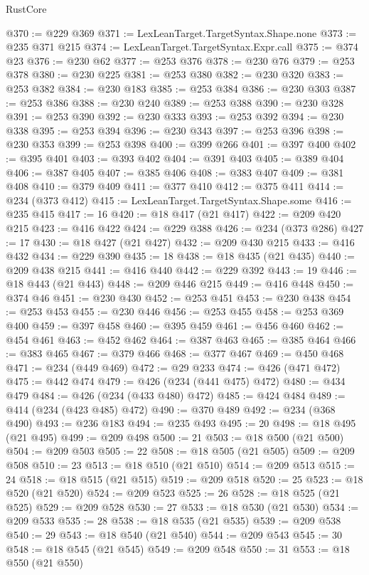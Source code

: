 \begin{lexlean}{RustCore}
\begin{coremodule}
@370 := @229 @369
@371 := LexLeanTarget.TargetSyntax.Shape.none
@373 := @235 @371 @215
@374 := LexLeanTarget.TargetSyntax.Expr.call
@375 := @374 @23
@376 := @230 @62
@377 := @253 @376
@378 := @230 @76
@379 := @253 @378
@380 := @230 @225
@381 := @253 @380
@382 := @230 @320
@383 := @253 @382
@384 := @230 @183
@385 := @253 @384
@386 := @230 @303
@387 := @253 @386
@388 := @230 @240
@389 := @253 @388
@390 := @230 @328
@391 := @253 @390
@392 := @230 @333
@393 := @253 @392
@394 := @230 @338
@395 := @253 @394
@396 := @230 @343
@397 := @253 @396
@398 := @230 @353
@399 := @253 @398
@400 := @399 @266
@401 := @397 @400
@402 := @395 @401
@403 := @393 @402
@404 := @391 @403
@405 := @389 @404
@406 := @387 @405
@407 := @385 @406
@408 := @383 @407
@409 := @381 @408
@410 := @379 @409
@411 := @377 @410
@412 := @375 @411
@414 := @234 (@373 @412)
@415 := LexLeanTarget.TargetSyntax.Shape.some
@416 := @235 @415
@417 := 16
@420 := @18 @417 (@21 @417)
@422 := @209 @420 @215
@423 := @416 @422
@424 := @229 @388
@426 := @234 (@373 @286)
@427 := 17
@430 := @18 @427 (@21 @427)
@432 := @209 @430 @215
@433 := @416 @432
@434 := @229 @390
@435 := 18
@438 := @18 @435 (@21 @435)
@440 := @209 @438 @215
@441 := @416 @440
@442 := @229 @392
@443 := 19
@446 := @18 @443 (@21 @443)
@448 := @209 @446 @215
@449 := @416 @448
@450 := @374 @46
@451 := @230 @430
@452 := @253 @451
@453 := @230 @438
@454 := @253 @453
@455 := @230 @446
@456 := @253 @455
@458 := @253 @369 @400
@459 := @397 @458
@460 := @395 @459
@461 := @456 @460
@462 := @454 @461
@463 := @452 @462
@464 := @387 @463
@465 := @385 @464
@466 := @383 @465
@467 := @379 @466
@468 := @377 @467
@469 := @450 @468
@471 := @234 (@449 @469)
@472 := @29 @233
@474 := @426 (@471 @472)
@475 := @442 @474
@479 := @426 (@234 (@441 @475) @472)
@480 := @434 @479
@484 := @426 (@234 (@433 @480) @472)
@485 := @424 @484
@489 := @414 (@234 (@423 @485) @472)
@490 := @370 @489
@492 := @234 (@368 @490)
@493 := @236 @183
@494 := @235 @493
@495 := 20
@498 := @18 @495 (@21 @495)
@499 := @209 @498
@500 := 21
@503 := @18 @500 (@21 @500)
@504 := @209 @503
@505 := 22
@508 := @18 @505 (@21 @505)
@509 := @209 @508
@510 := 23
@513 := @18 @510 (@21 @510)
@514 := @209 @513
@515 := 24
@518 := @18 @515 (@21 @515)
@519 := @209 @518
@520 := 25
@523 := @18 @520 (@21 @520)
@524 := @209 @523
@525 := 26
@528 := @18 @525 (@21 @525)
@529 := @209 @528
@530 := 27
@533 := @18 @530 (@21 @530)
@534 := @209 @533
@535 := 28
@538 := @18 @535 (@21 @535)
@539 := @209 @538
@540 := 29
@543 := @18 @540 (@21 @540)
@544 := @209 @543
@545 := 30
@548 := @18 @545 (@21 @545)
@549 := @209 @548
@550 := 31
@553 := @18 @550 (@21 @550)

\end{coremodule}
\end{lexlean}

